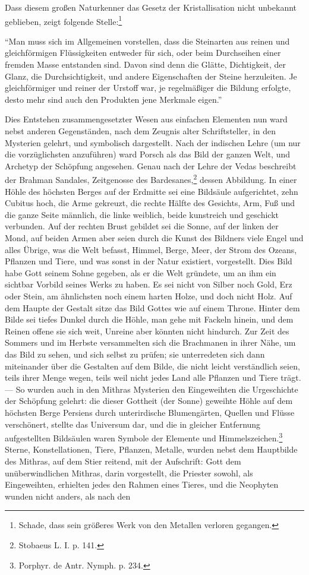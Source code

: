 \documentclass[a4paper, 11pt, oneside, polutonikogreek, german]{article}
\begin{document}
Dass diesem großen Naturkenner das Gesetz der Kristallisation nicht unbekannt geblieben, zeigt folgende Stelle:\footnote{Schade, dass sein größeres Werk von den Metallen verloren gegangen.}

"`Man muss sich im Allgemeinen vorstellen, dass die Steinarten aus reinen und gleichförmigen Flüssigkeiten entweder für sich, oder beim Durchseihen einer fremden Masse entstanden sind. Davon sind denn die Glätte, Dichtigkeit, der Glanz, die Durchsichtigkeit, und andere Eigenschaften der Steine herzuleiten. Je gleichförmiger und reiner der Urstoff war, je regelmäßiger die Bildung erfolgte, desto mehr sind auch den Produkten jene Merkmale eigen."'

Dies Entstehen zusammengesetzter Wesen aus einfachen Elementen nun ward nebst anderen Gegenständen, nach dem Zeugnis alter Schriftsteller, in den Mysterien gelehrt, und symbolisch dargestellt. Nach der indischen Lehre (um nur die vorzüglichsten anzuführen) ward Porsch als das Bild der ganzen Welt, und Archetyp der Schöpfung angesehen. Genau nach der Lehre der Vedas beschreibt der Brahman Sandales, Zeitgenosse des Bardesanes,\footnote{Stobaeus L. I. p. 141.} dessen Abbildung. In einer Höhle des höchsten Berges auf der Erdmitte sei eine Bildsäule aufgerichtet, zehn Cubitus hoch, die Arme gekreuzt, die rechte Hälfte des Gesichts, Arm, Fuß und die ganze Seite männlich, die linke weiblich, beide kunstreich und geschickt verbunden. Auf der rechten Brust gebildet sei die Sonne, auf der linken der Mond, auf beiden Armen aber seien durch die Kunst des Bildners viele Engel und alles Übrige, was die Welt befasst, Himmel, Berge, Meer, der Strom des Ozeans, Pflanzen und Tiere, und was sonst in der Natur existiert, vorgestellt. Dies Bild habe Gott seinem Sohne gegeben, als er die Welt gründete, um an ihm ein sichtbar Vorbild seines Werks zu haben. Es sei nicht von Silber noch Gold, Erz oder Stein, am ähnlichsten noch einem harten Holze, und doch nicht Holz. Auf dem Haupte der Gestalt sitze das Bild Gottes wie auf einem Throne. Hinter dem Bilde sei tiefes Dunkel durch die Höhle, man gehe mit Fackeln hinein, und dem Reinen offene sie sich weit, Unreine aber könnten nicht hindurch. Zur Zeit des Sommers und im Herbste versammelten sich die Brachmanen in ihrer Nähe, um das Bild zu sehen, und sich selbst zu prüfen; sie unterredeten sich dann miteinander über die Gestalten auf dem Bilde, die nicht leicht verständlich seien, teils ihrer Menge wegen, teils weil nicht jedes Land alle Pflanzen und Tiere trägt. --- So wurden auch in den Mithras Mysterien den Eingeweihten die Urgeschichte der Schöpfung gelehrt: die dieser Gottheit (der Sonne) geweihte Höhle auf dem höchsten Berge Persiens durch unterirdische Blumengärten, Quellen und Flüsse verschönert, stellte das Universum dar, und die in gleicher Entfernung aufgestellten Bildsäulen waren Symbole der Elemente und Himmelszeichen.\footnote{Porphyr. de Antr. Nymph. p. 234.} Sterne, Konstellationen, Tiere, Pflanzen, Metalle, wurden nebst dem Hauptbilde des Mithras, auf dem Stier reitend, mit der Aufschrift: Gott dem unüberwindlichen Mithras, darin vorgestellt, die Priester sowohl, als Eingeweihten, erhielten jedes den Rahmen eines Tieres, und die Neophyten wunden nicht anders, als nach den 
\end{document}
